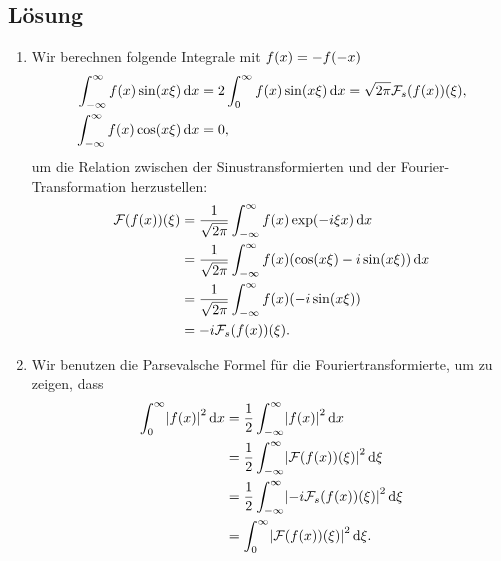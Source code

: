 \documentclass{exercise}
\begin{document}
    \subsection*{Lösung}
    \begin{enumerate}
        \item Wir berechnen folgende Integrale mit \(f\parentheses*{x} = -f\parentheses*{-x}\)
        \begin{align*}
            \int_{-\infty}^\infty f\parentheses*{x}\sin\parentheses*{x\xi}\d x &= 2\int_0^\infty f\parentheses*{x}\sin\parentheses*{x\xi}\d x = \sqrt{2\pi}\mathcal{F}_s\parentheses*{f\parentheses*{x}}\parentheses*{\xi},\\
            \int_{-\infty}^\infty f\parentheses*{x}\cos\parentheses*{x\xi}\d x &= 0,
        \end{align*}
        um die Relation zwischen der Sinustransformierten und der Fourier-Transformation herzustellen:
        \begin{align*}
            \mathcal{F}\parentheses*{f\parentheses*{x}}\parentheses*{\xi} &= \frac{1}{\sqrt{2\pi}}\int_{-\infty}^\infty f\parentheses*{x}\exp\parentheses*{-i\xi x}\d x\\
            &= \frac{1}{\sqrt{2\pi}}\int_{-\infty}^\infty f\parentheses*{x}\parentheses*{\cos\parentheses*{x\xi} - i\sin\parentheses*{x\xi}}\d x\\
            &= \frac{1}{\sqrt{2\pi}}\int_{-\infty}^\infty f\parentheses*{x}\parentheses*{-i\sin\parentheses*{x\xi}}\\
            &= -i\mathcal{F}_s\parentheses*{f\parentheses*{x}}\parentheses*{\xi}.
        \end{align*}
        \item Wir benutzen die Parsevalsche Formel für die Fouriertransformierte, um zu zeigen, dass
        \begin{align*}
            \int_0^\infty \absolute*{f\parentheses*{x}}^2 \d x &= \frac{1}{2}\int_{-\infty}^\infty \absolute*{f\parentheses*{x}}^2 \d x\\
            &= \frac{1}{2}\int_{-\infty}^\infty \absolute*{\mathcal{F}\parentheses*{f\parentheses*{x}}\parentheses*{\xi}}^2 \d\xi\\
            &= \frac{1}{2}\int_{-\infty}^\infty \absolute*{-i\mathcal{F}_s\parentheses*{f\parentheses*{x}}\parentheses*{\xi}}^2 \d\xi\\
            &= \int_0^\infty \absolute*{\mathcal{F}\parentheses*{f\parentheses*{x}}\parentheses*{\xi}}^2 \d\xi.
        \end{align*}

\end{enumerate}
\end{document}

